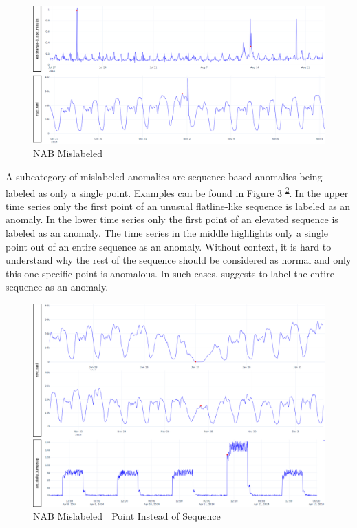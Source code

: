 \documentclass[12pt,oneside]{article}
\newcommand{\supref}[1]{\textsuperscript{\footnotesize{\ref{#1}}}}
\begin{document}
\begin{figure}[htbp] 
    \centering 
    \includegraphics[width=\textwidth]{mislab.png}
    \caption{NAB Mislabeled}
    \label{fig:mislab}
\end{figure}

A subcategory of mislabeled anomalies are sequence-based anomalies being labeled as only a single point. Examples can be found in Figure 3 \supref{fig:point_seq}. In the upper time series only the first point of an unusual flatline-like sequence is labeled as an anomaly. In the lower time series only the first point of an elevated sequence is labeled as an anomaly. The time series in the middle highlights only a single point out of an entire sequence as an anomaly. Without context, it is hard to understand why the rest of the sequence should be considered as normal and only this one specific point is anomalous. In such cases, \cite[p.~4-5]{wu2021current} suggests to label the entire sequence as an anomaly.

\begin{figure}[htbp] 
    \centering 
    \includegraphics[width=\textwidth]{point_seq.png}
    \caption{NAB Mislabeled | Point Instead of Sequence}
    \label{fig:point_seq}
\end{figure}
\end{document}
